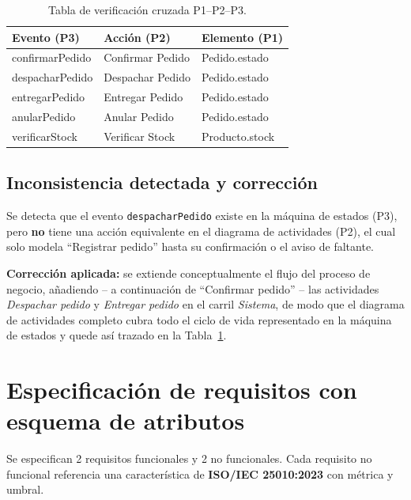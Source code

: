 \documentclass[11pt,a4paper]{article}
\begin{document}
\begin{table}[h!]
\centering
\begin{tabular}{lll}
\toprule
\textbf{Evento (P3)} & \textbf{Acción (P2)} & \textbf{Elemento (P1)} \\
\midrule
confirmarPedido & Confirmar Pedido & Pedido.estado \\
despacharPedido & Despachar Pedido & Pedido.estado \\
entregarPedido  & Entregar Pedido  & Pedido.estado \\
anularPedido    & Anular Pedido    & Pedido.estado \\
verificarStock  & Verificar Stock  & Producto.stock \\
\bottomrule
\end{tabular}
\caption{Tabla de verificación cruzada P1--P2--P3.}
\label{tab:p4}
\end{table}

\subsection*{Inconsistencia detectada y corrección}

Se detecta que el evento \texttt{despacharPedido} existe en la máquina de estados
(P3), pero \textbf{no} tiene una acción equivalente en el diagrama de actividades
(P2), el cual solo modela ``Registrar pedido'' hasta su confirmación o el aviso de
faltante.

\textbf{Corrección aplicada:} se extiende conceptualmente el flujo del proceso de
negocio, añadiendo -- a continuación de ``Confirmar pedido'' -- las actividades
\textit{Despachar pedido} y \textit{Entregar pedido} en el carril \textit{Sistema},
de modo que el diagrama de actividades completo cubra todo el ciclo de vida
representado en la máquina de estados y quede así trazado en la Tabla~\ref{tab:p4}.

\newpage
\section{Especificación de requisitos con esquema de atributos}
\label{sec:p5}

Se especifican 2 requisitos funcionales y 2 no funcionales. Cada requisito no
funcional referencia una característica de \textbf{ISO/IEC 25010:2023} con métrica y
umbral.
\end{document}
